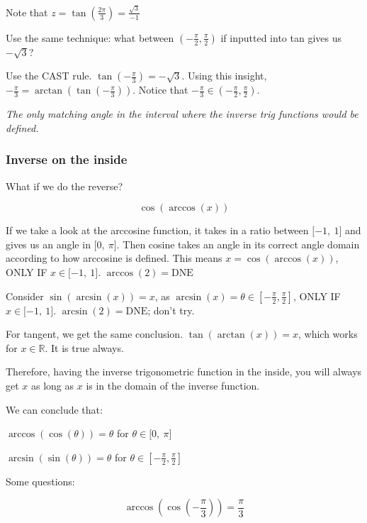 \documentclass[12pt]{article}
\theoremstyle{plain}
\theoremstyle{remark}
\theoremstyle{definition}
\begin{document}
Note that
\(z = \tan\left( \frac{2\pi}{3} \right) = \frac{\sqrt{3}}{- 1}\)

Use the same technique: what between
\(( - \frac{\pi}{2},\frac{\pi}{2})\) if inputted into tan gives us
\(- \sqrt{3}\)?

Use the CAST rule. \(\tan\left( - \frac{\pi}{3} \right) = - \sqrt{3}\).
Using this insight,
\(- \frac{\pi}{3} = \arctan\left( \tan\left( - \frac{\pi}{3} \right) \right)\).
Notice that
\(- \frac{\pi}{3} \in \left( - \frac{\pi}{2},\frac{\pi}{2} \right)\).

\emph{The only matching angle in the interval where the inverse trig
functions would be defined.}


\subsubsection{\texorpdfstring{ Inverse on the
inside}{ Inverse on the inside}}

What if we do the reverse?

\[\cos\left( \arccos(x) \right)\]

If we take a look at the arccosine function, it takes in a ratio between
\(\lbrack - 1,\ 1\rbrack\) and gives us an angle in
\(\lbrack 0,\ \pi\rbrack\). Then cosine takes an angle in its correct
angle domain according to how arccosine is defined. This means
\(x = \cos\left( \arccos(x) \right)\), ONLY IF
\(x \in \lbrack - 1,\ 1\rbrack\). \(\arccos(2) = \text{DNE}\)

Consider \(\sin\left( \arcsin(x) \right) = x\), as
\(\arcsin(x) = \theta \in \left\lbrack - \frac{\pi}{2},\frac{\pi}{2} \right\rbrack\),
ONLY IF \(x \in \lbrack - 1,\ 1\rbrack\). \(\arcsin(2) = \text{DNE}\);
don't try.

For tangent, we get the same conclusion.
\(\tan\left( \arctan(x) \right) = x\), which works for
\(x\mathbb{\in R}\). It is true always.

Therefore, having the inverse trigonometric function in the inside, you
will always get \(x\) as long as \(x\) is in the domain of the inverse
function.

We can conclude that:

\(\arccos\left( \cos(\theta) \right) = \theta\) for
\(\theta \in \lbrack 0,\ \pi\rbrack\)

\(\arcsin\left( \sin(\theta) \right) = \theta\) for
\(\theta \in \left\lbrack - \frac{\pi}{2},\frac{\pi}{2} \right\rbrack\)

Some questions:

\[\arccos\left( \cos\left( - \frac{\pi}{3} \right) \right) = \frac{\pi}{3}\]
\end{document}
